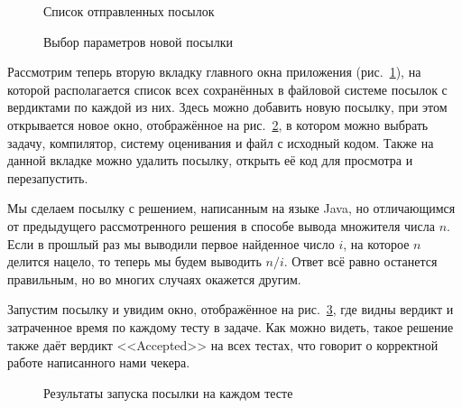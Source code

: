 \begin{figure}[!b]
\caption{Список отправленных посылок}
\label{screen_submissions}
\end{figure}

\begin{figure}[!b]
\caption{Выбор параметров новой посылки}
\label{screen_new_submission}
\end{figure}

Рассмотрим теперь вторую вкладку главного окна приложения (рис.~\ref{screen_submissions}), на которой располагается список всех сохранённых в файловой системе посылок с вердиктами по каждой из них. Здесь можно добавить новую посылку, при этом открывается новое окно, отображённое на рис.~\ref{screen_new_submission}, в котором можно выбрать задачу, компилятор, систему оценивания и файл с исходный кодом. Также на данной вкладке можно удалить посылку, открыть её код для просмотра и перезапустить.

Мы сделаем посылку с решением, написанным на языке Java, но отличающимся от предыдущего рассмотренного решения в способе вывода множителя числа $n$. Если в прошлый раз мы выводили первое найденное число $i$, на которое $n$ делится нацело, то теперь мы будем выводить $n/i$. Ответ всё равно останется правильным, но во многих случаях окажется другим.

Запустим посылку и увидим окно, отображённое на рис.~\ref{screen_submission_results}, где видны вердикт и затраченное время по каждому тесту в задаче. Как можно видеть, такое решение также даёт вердикт <<Accepted>> на всех тестах, что говорит о корректной работе написанного нами чекера.

\begin{figure}[!h]
\caption{Результаты запуска посылки на каждом тесте}
\label{screen_submission_results}
\end{figure}